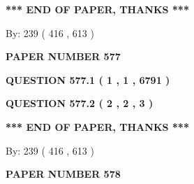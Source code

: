 \documentclass[12pt]{article}
\begin{document}
   
   
   
   
\vspace{1.0in} 
{\textbf{\large{ *** END OF PAPER, THANKS *** }}} 
   
   
\hspace{1.0in} By: 
 239 ( 416 ,  613 )
   
   
   
   
\newpage 
\setcounter{page}{ 
   577001 } 
   
   
   
   
 {\textbf{ \Large{ PAPER NUMBER  577  }}}
   
   
\vspace{0.2in}
   
   
   
   
   
   
 \vspace{0.2in}
 
 
 
 
   
   
  
\vspace{0.2in}
  
{\textbf{\Large{QUESTION
577.1 
 ( 1 , 1 , 6791 )
}}}
  
  
  
\vspace{0.2in}
  
{\textbf{\Large{QUESTION
577.2 
 ( 2 , 2 , 3 )
}}}
  
  
   
   
 \vspace{0.2in}
 
   
   
   
   
\vspace{1.0in} 
{\textbf{\large{ *** END OF PAPER, THANKS *** }}} 
   
   
\hspace{1.0in} By: 
 239 ( 416 ,  613 )
   
   
   
   
\newpage 
\setcounter{page}{ 
   578001 } 
   
   
   
   
 {\textbf{ \Large{ PAPER NUMBER  578  }}}
   
   
\vspace{0.2in}
   
\end{document}
